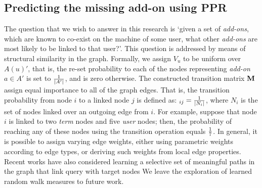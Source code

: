 \documentclass[11pt,oneside]{book}
\let\Oldsubsection\subsection
\renewcommand{\subsection}{\FloatBarrier\Oldsubsection}
\newcommand{\transition}{{\bf M}}
\begin{document}

\subsection{Predicting the missing add-on using PPR}

The question that we wish to answer in this research is `given
a set of {\it add-ons}, which are known to co-exist on the machine of
some user, what other {\it add-ons} are most likely to be linked to
that user?'. This question is addressed by means of structural
similarity in the graph. Formally, we assign $V_u$ to be uniform over $A(u)'$, that is, the re-set probability to each of the nodes representing {\it add-on} $a\in A'$ is set to ${1 \over \mid A' \mid}$, and is zero otherwise. The constructed transition matrix $\transition$ assign equal importance to all of
the graph edges. That is, the transition probability from node $i$ to
a linked node $j$ is defined as: $_{ij}={1 \over \mid N_i \mid}$,
where $N_i$ is the set of nodes linked over an outgoing edge from $i$. For example, suppose that node $i$ is linked to two {\it term} nodes and five {\it user} nodes; then, the probability of reaching any of these nodes using the transition operation equals ${1\over 7}$. In general, it is possible to assign varying edge weights, either using parametric weights according to edge types, or deriving such weights from local edge properties. Recent works have also considered learning a selective set of meaningful paths in the graph that link query with target nodes \citep{minkov2010improving,lao2010relational} We leave the exploration of learned random walk measures to future work. 
\end{document}
